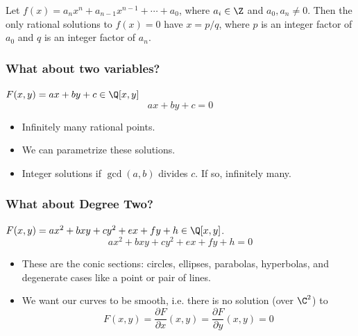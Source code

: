 \begin{frame}[plain]
\begin{thm}
Let $f(x)= a_n x^n + a_{n-1} x^{n-1} + \cdots + a_0$, where $a_i \in \Z$ and $a_0,a_n \neq 0$. Then the only rational solutions to $f(x)=0$ have $x= p/q$, where $p$ is an integer factor of $a_0$ and $q$ is an integer factor of $a_n$. 
\end{thm}
\end{frame}





\begin{frame}[plain] \frametitle{What about two variables?}
$F(x,y)= ax + by + c \in \Q[x,y]$ \pspace
	\[
	ax + by + c = 0 
	\] \pspace 

\begin{itemize}
\item Infinitely many rational points. \pspace
\item We can parametrize these solutions. \pspace
\item Integer solutions if $\gcd(a,b)$ divides $c$. If so, infinitely many. 
\end{itemize}
\end{frame}





\begin{frame}[plain] \frametitle{What about Degree Two?}

$F(x,y)= ax^2+bxy + cy^2 + ex+fy+h \in \Q[x,y]$. \pspace
	\[
	ax^2+bxy + cy^2 + ex+fy+h= 0
	\] \pspace

\begin{itemize}
\item  These are the conic sections: circles, ellipses, parabolas, hyperbolas, and degenerate cases like a point or pair of lines. 

\item We want our curves to be smooth, i.e. there is no solution (over $\C^2$) to
	\[
	F(x,y)= \dfrac{\partial F}{\partial x}(x,y)= \dfrac{\partial F}{\partial y}(x,y)= 0
	\]
\end{itemize}
\end{frame}





